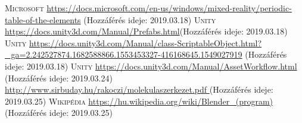\documentclass[colorlinks]{thesis-ekf}
\theoremstyle{definition}
\theoremstyle{remark}
\begin{document}
\begin{thebibliography}{1}
	 \textsc{Microsoft} \url{https://docs.microsoft.com/en-us/windows/mixed-reality/periodic-table-of-the-elements} (Hozzáférés ideje: 2019.03.18)
	 \textsc{Unity} \url{https://docs.unity3d.com/Manual/Prefabs.html}(Hozzáférés ideje: 2019.03.18)
	 \textsc{Unity} \url{https://docs.unity3d.com/Manual/class-ScriptableObject.html?_ga=2.242527874.1682588866.1553453327-416168645.1549027919} (Hozzáférés ideje: 2019.03.18)
	 \textsc{Unity} \url{https://docs.unity3d.com/Manual/AssetWorkflow.html}  (Hozzáférés ideje: 2019.03.24)
	 \url{http://www.sirbuday.hu/rakoczi/molekulaszerkezet.pdf } (Hozzáférés ideje: 2019.03.25)
	 \textsc{Wikipédia} \url{https://hu.wikipedia.org/wiki/Blender_(program)} (Hozzáférés ideje: 2019.03.25)
\end{thebibliography}
\end{document}
